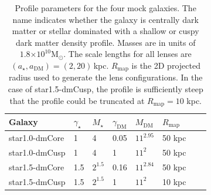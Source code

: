 \documentclass[galley,usenatbib]{mn2e}
\newcommand{\Rmap}{\ensuremath{R_\mathrm{map}}}
\newcommand{\Msun}{\ensuremath{\mathrm{M}_\odot}}
\newcommand{\e}[1]{\ensuremath{\times 10^{#1}}}
\newcommand{\mockAA}{{\sc star1.0-dmCore}}
\newcommand{\mockAC}{{\sc star1.0-dmCusp}}
\newcommand{\mockBB}{{\sc star1.5-dmCore}}
\newcommand{\mockBC}{{\sc star1.5-dmCusp}}
\begin{document}
\begin{table}
\begin{tabular}{llllllll}
Galaxy & $\gamma_\star$ & $M_\star$ & $\gamma_\mathrm{DM}$ & $M_\mathrm{DM}$ & $\Rmap$ \\
\hline
\mockAA & 1 & 4 & 0.05 & $11^{2.95}$ & 50 kpc\\ %
\mockAC & 1 & 4 & 1 & $11^2$ & 50 kpc \\ %
\mockBB & 1.5 & $2^{1.5}$ & 0.16 & $11^{2.84}$ & 50 kpc \\ %
\mockBC & 1.5 & $2^{1.5}$ & 1 & $11^2$ & 10 kpc %
\end{tabular}
\caption{Profile parameters for the four mock galaxies. The name indicates whether 
  the galaxy is centrally dark matter or stellar dominated with a shallow or cuspy 
  dark matter density profile.  Masses are in units of
  $1.8\e{10}\Msun$. The scale lengths for all lenses are
  $(a_\star,a_\mathrm{DM})=(2,20)$\,kpc. $\Rmap$ is the 2D projected radius
used to generate the lens configurations. In the case of \mockBC, the profile is 
sufficiently steep that the profile could be truncated at $\Rmap = 10$ kpc.}
\label{mock galaxy params}
\end{table}
\end{document}
